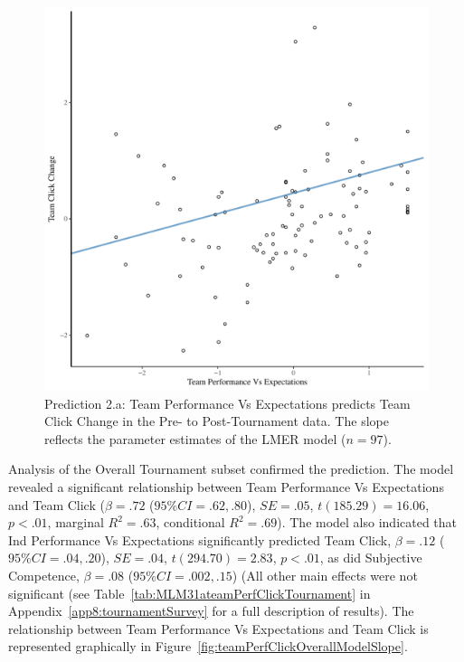 \begin{CJK}{UTF8}{gbsn}
    \begin{figure}[htbp]
      \centering
    \includegraphics[scale=.5]{images/teamPerfClickDeltaModelSlope.pdf}
      \caption{Prediction 2.a: Team Performance Vs Expectations predicts Team Click Change in the Pre- to Post-Tournament data. The slope reflects the parameter estimates of the LMER model ($n = 97$).}
      \label{fig:teamPerfClickDeltaModelSlope}
    \end{figure}


Analysis of the Overall Tournament subset confirmed the prediction.
The model revealed a significant relationship between Team Performance Vs Expectations and Team Click ($\beta = .72$ ($95\% CI = .62, .80$), $SE = .05$, $t(185.29) = 16.06$, $p < .01$, marginal $R^2 = .63$, conditional $R^2 = .69$).
The model also indicated that Ind Performance Vs Expectations significantly predicted Team Click, $\beta = .12$ ($95\% CI =  .04, .20$), $SE = .04$, $t(294.70) = 2.83$, $p < .01$, as did Subjective Competence, $\beta = .08$ ($95\% CI =  .002, .15$) (All other main effects were not significant (see Table~\ref{tab:MLM31ateamPerfClickTournament} in Appendix~\ref{app8:tournamentSurvey} for a full description of results).  The relationship between Team Performance Vs Expectations  and Team Click is represented graphically in Figure~\ref{fig:teamPerfClickOverallModelSlope}.


\end{CJK}
